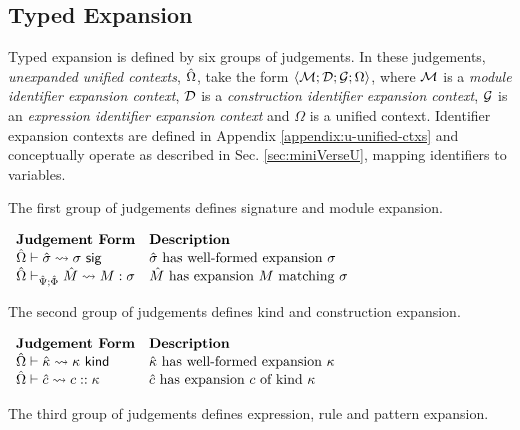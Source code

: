 \subsection{Typed Expansion}

Typed expansion is defined by six groups of judgements. In these judgements, \emph{unexpanded unified contexts}, ${\hat\Omega}$, take the form $\langle \mathcal{M}; \mathcal{D}; \mathcal{G}; \Omega \rangle$, where $\mathcal{M}$ is a \emph{module identifier expansion context}, $\mathcal{D}$ is a \emph{construction identifier expansion context}, $\mathcal{G}$ is an \emph{expression identifier expansion context} and $\Omega$ is a unified context. Identifier expansion contexts are defined in Appendix \ref{appendix:u-unified-ctxs} and conceptually operate as described in Sec. \ref{sec:miniVerseU}, mapping identifiers to variables.

The first group of judgements defines signature and module expansion.

\vspace{6px}
$\begin{array}{ll}
\textbf{Judgement Form} & \textbf{Description}\\
{\hat\Omega} \vdash {\hat\sigma} \leadsto \sigma~\mathsf{sig} & \text{${\hat\sigma}$ has well-formed expansion $\sigma$}\\
{\hat\Omega} \vdash_{\hat{\Psi}; \hat\Phi} {\hat M} \leadsto M : \sigma & \text{${\hat M}$ has expansion $M$ matching $\sigma$}
\end{array}$
\vspace{6px}

The second group of judgements defines kind and construction expansion.

\vspace{6px}
$\begin{array}{ll}
\textbf{Judgement Form} & \textbf{Description}\\
{\hat\Omega} \vdash {\hat\kappa} \leadsto \kappa~\mathsf{kind} & \text{${\hat\kappa}$ has well-formed expansion $\kappa$}\\
{\hat\Omega} \vdash {\hat c} \leadsto c :: \kappa & \text{${\hat c}$ has expansion $c$ of kind $\kappa$}
\end{array}$
\vspace{6px}

The third group of judgements defines expression, rule and pattern expansion.

